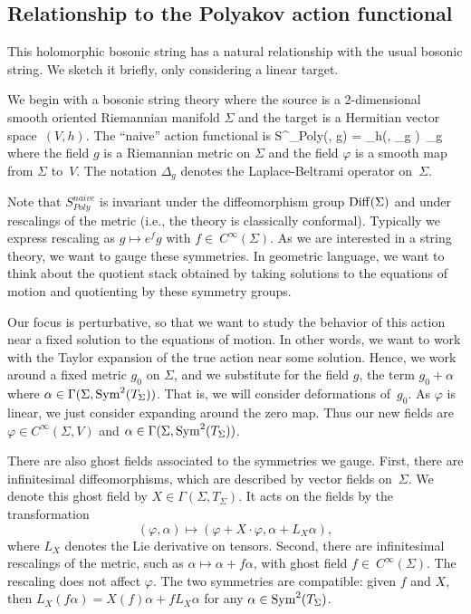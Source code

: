 \subsection{Relationship to the Polyakov action functional}

This holomorphic bosonic string has a natural relationship with the usual bosonic string.
We sketch it briefly, only considering a linear target.

We begin with a bosonic string theory where the source is a 2-dimensional smooth oriented Riemannian manifold $\Sigma$ and the target is a Hermitian vector space~$(V,h)$. 
The ``naive'' action functional is
\ben
S^{}_{Poly}(\varphi, g) = \int_\Sigma h(\varphi, \Delta_{g} \varphi)\, \dvol_g
\een
where the field $g$ is a Riemannian metric on $\Sigma$ and the field $\varphi$ is a smooth map from $\Sigma$ to~$V$.
The notation $\Delta_g$ denotes the Laplace-Beltrami operator on~$\Sigma$. 

Note that $S^{naive}_{Poly}$ is invariant under the diffeomorphism group ${\rm Diff}(\Sigma)$ and under rescalings of the metric
(i.e., the theory is classically conformal).
Typically we express rescaling as $g \mapsto e^{f} g$ with $f \in~C^\infty(\Sigma)$.
As we are interested in a string theory, we want to gauge these symmetries.
In geometric language, we want to think about the quotient stack 
obtained by taking solutions to the equations of motion and quotienting by these symmetry groups.

Our focus is perturbative, so that we want to study the behavior of this action near a fixed solution to the equations of motion.
In other words, we want to work with the Taylor expansion of the true action near some solution.
Hence, we work around a fixed metric $g_0$ on $\Sigma$, 
and we substitute for the field $g$,
the term $g_0+\alpha$ where $\alpha \in \Gamma(\Sigma,{\rm Sym}^2(T_\Sigma))$.
That is, we will consider deformations of~$g_0$.
As $\varphi$ is linear, we just consider expanding around the zero map.
Thus our new fields are $\varphi \in C^\infty(\Sigma,V)$ and $\alpha \in \Gamma(\Sigma,{\rm Sym}^2(T_\Sigma))$.

There are also ghost fields associated to the symmetries we gauge.
First, there are infinitesimal diffeomorphisms,  which are described by vector fields on~$\Sigma$.
We denote this ghost field by $X \in \Gamma(\Sigma,T_\Sigma)$.
It acts on the fields by the transformation 
\[
(\varphi,\alpha) \mapsto (\varphi + X \cdot \varphi, \alpha + L_X \alpha), 
\]
where $L_X$ denotes the Lie derivative on tensors.
Second, there are infinitesimal rescalings of the metric, 
such as $\alpha \mapsto \alpha + f \alpha$, 
with ghost field $f \in~C^\infty(\Sigma)$.
The rescaling does not affect $\varphi$.
The two symmetries are compatible: 
given $f$ and $X$, then $L_{X} (f \alpha) = X(f) \alpha + f L_X \alpha$ for any $\alpha \in {\rm Sym}^2(T_\Sigma)$.

